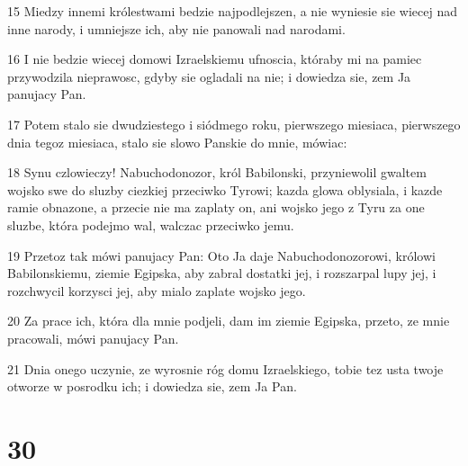 \par 15 Miedzy innemi królestwami bedzie najpodlejszen, a nie wyniesie sie wiecej nad inne narody, i umniejsze ich, aby nie panowali nad narodami.
\par 16 I nie bedzie wiecej domowi Izraelskiemu ufnoscia, któraby mi na pamiec przywodzila nieprawosc, gdyby sie ogladali na nie; i dowiedza sie, zem Ja panujacy Pan.
\par 17 Potem stalo sie dwudziestego i siódmego roku, pierwszego miesiaca, pierwszego dnia tegoz miesiaca, stalo sie slowo Panskie do mnie, mówiac:
\par 18 Synu czlowieczy! Nabuchodonozor, król Babilonski, przyniewolil gwaltem wojsko swe do sluzby ciezkiej przeciwko Tyrowi; kazda glowa oblysiala, i kazde ramie obnazone, a przecie nie ma zaplaty on, ani wojsko jego z Tyru za one sluzbe, która podejmo wal, walczac przeciwko jemu.
\par 19 Przetoz tak mówi panujacy Pan: Oto Ja daje Nabuchodonozorowi, królowi Babilonskiemu, ziemie Egipska, aby zabral dostatki jej, i rozszarpal lupy jej, i rozchwycil korzysci jej, aby mialo zaplate wojsko jego.
\par 20 Za prace ich, która dla mnie podjeli, dam im ziemie Egipska, przeto, ze mnie pracowali, mówi panujacy Pan.
\par 21 Dnia onego uczynie, ze wyrosnie róg domu Izraelskiego, tobie tez usta twoje otworze w posrodku ich; i dowiedza sie, zem Ja Pan.

\chapter{30}

